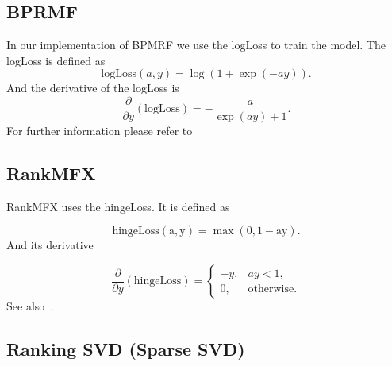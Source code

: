 \subsection{BPRMF}

In our implementation of BPMRF we use the logLoss to train the model. The logLoss is defined
as
\begin{equation}
\textrm{logLoss}(a,y)=\log(1+\exp(-ay)).
\end{equation}
And the derivative of the logLoss is
\begin{equation}
\frac{\partial}{\partial y}(\textrm{logLoss})=-\frac{a}{\exp(ay)+1}.
\end{equation}
For further information please refer to~\cite{Rendle:2009:BBP:1795114.1795167}


\subsection{RankMFX}

RankMFX uses the hingeLoss. It is defined as

\begin{equation}
\mathrm{\textrm{hingeLoss}(a,y)=\max(0,1-ay)}.
\end{equation}
And its derivative

\begin{equation}
\frac{\partial}{\partial y}(\textrm{hingeLoss})=\begin{cases}
-y, & ay<1,\\
0, & \textrm{otherwise}.
\end{cases}
\end{equation}
See also~\cite{diaz2012happening}.


\subsection{Ranking SVD (Sparse SVD)}

